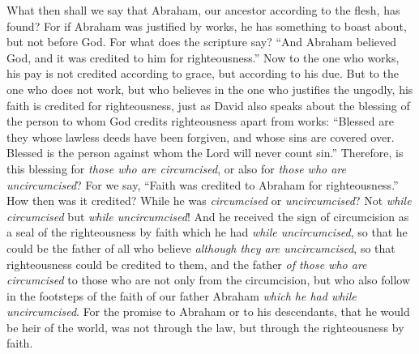 \begin{biblechapter} %
 What then shall we say that Abraham, our ancestor according to the flesh, has found?
\verse For if Abraham was justified by works, he has something to boast about, but not before God.
\verse For what does the scripture say? “And Abraham believed God, and it was credited to him for righteousness.”
\verse Now to the one who works, his pay is not credited according to grace, but according to his due.
\verse But to the one who does not work, but who believes in the one who justifies the ungodly, his faith is credited for righteousness,
\verse just as David also speaks about the blessing of the person to whom God credits righteousness apart from works:
\verse “Blessed are they whose lawless deeds have been forgiven, 
and whose sins are covered over.
\verse Blessed is the person against whom the Lord will never count sin.”
\verse Therefore, is this blessing for \textit{those who are circumcised}, or also for \textit{those who are uncircumcised}? For we say, “Faith was credited to Abraham for righteousness.”
\verse How then was it credited? While he was \textit{circumcised} or \textit{uncircumcised}? Not \textit{while circumcised} but \textit{while uncircumcised}!
\verse And he received the sign of circumcision as a seal of the righteousness by faith which he had \textit{while uncircumcised}, so that he could be the father of all who believe \textit{although they are uncircumcised}, so that righteousness could be credited to them,
\verse and the father \textit{of those who are circumcised} to those who are not only from the circumcision, but who also follow in the footsteps of the faith of our father Abraham \textit{which he had while uncircumcised}.
 For the promise to Abraham or to his descendants, that he would be heir of the world, was not through the law, but through the righteousness by faith.

\end{biblechapter}
